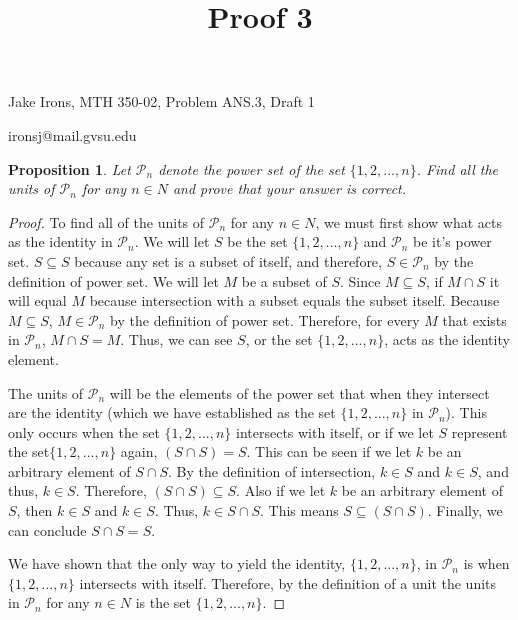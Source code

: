 \documentclass[11 pt]{article}
\title{Proof 3}
\newtheorem{proposition}{Proposition}
\newcommand{\newpar}{\vspace{.15in}\noindent}
\begin{document}
\noindent Jake Irons, MTH 350-02, Problem ANS.3, Draft 1

\noindent ironsj@mail.gvsu.edu

\newpar
\begin{proposition}
Let $\mathcal{P}_n$ denote the power set of the set $\{1, 2, . . . , n\}$. Find all the units of $\mathcal{P}_n$ for any
$n \in N$ and prove that your answer is correct.
\end{proposition}
\begin{proof}
To find all of the units of $\mathcal{P}_n$ for any $n \in N$, we must first show what acts as the identity in $\mathcal{P}_n$. We will let $S$ be the set $\{1, 2, . . . , n\}$ and $\mathcal{P}_n$ be it's power set. $S \subseteq S$ because any set is a subset of itself, and therefore, $S \in \mathcal{P}_n$ by the definition of power set. We will let $M$ be a subset of $S$. Since $M \subseteq S$, if $M \cap S$ it will equal $M$ because intersection with a subset equals the subset itself. Because $M \subseteq S$, $M \in \mathcal{P}_n$ by the definition of power set. Therefore, for every $M$ that exists in $\mathcal{P}_n$, $M \cap S=M$. Thus, we can see $S$, or the set $\{1, 2, . . . , n\}$, acts as the identity element.

\newpar
The units of $\mathcal{P}_n$ will be the elements of the power set that when they intersect are the identity (which we have established as the set $\{1, 2, . . . , n\}$ in $\mathcal{P}_n$). This only occurs when the set $\{1, 2, . . . , n\}$ intersects with itself, or if we let $S$ represent the set$\{1, 2, . . . , n\}$ again, $(S \cap S) = S$. This can be seen if we let $k$ be an arbitrary element of $S \cap S$. By the definition of intersection, $k \in S$ and $k \in S$, and thus, $k \in S$. Therefore, $(S \cap S) \subseteq S$. Also if we let $k$ be an arbitrary element of $S$, then $k \in S$ and $k \in S$. Thus, $k \in S \cap S$. This means $S \subseteq  (S \cap S)$. Finally, we can conclude $S \cap S = S$.

\newpar
We have shown that the only way to yield the identity, $\{1, 2, . . . , n\}$, in $\mathcal{P}_n$ is when $\{1, 2, . . . , n\}$ intersects with itself. Therefore, by the definition of a unit the units in $\mathcal{P}_n$ for any $n \in N$ is the set $\{1, 2, . . . , n\}$.


\end{proof}
\end{document}
